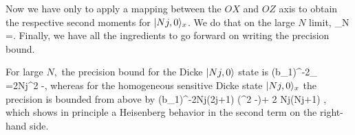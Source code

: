 Now we have only to apply a mapping between the $OX$ and $OZ$ axis to obtain the respective second moments for $\vert Nj,0 \rangle_{x}$.
We do that on the large $N$ limit,
\be
  \lim_{N \to \infty} =.
\ee
Finally, we have all the ingredients to go forward on writing the precision bound.

For large $N,$ the precision bound for the Dicke $\vert Nj,0 \rangle$ state is
\be
\label{eq:exact precision bound for dicke ih state}
(\Delta b_1)^{-2}_{\max} =2Nj\lpar \sigma^2
-\eta\rpar,
\ee
whereas for the homogeneous sensitive Dicke state $\vert Nj,0 \rangle_x$ the precision is bounded from above by
\be
(\Delta b_1)^{-2}\leq Nj(2j+1) (\sigma^2 -\eta)+ 2 Nj(Nj+1) \eta,
\ee
which shows in principle a Heisenberg behavior in the second term on
the right-hand side.
%
%
%
%
%
%
%
%

